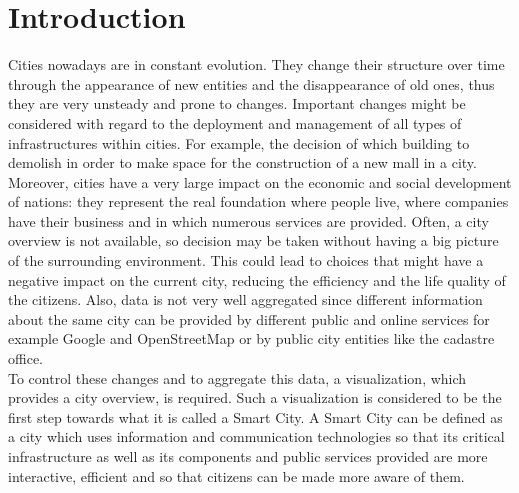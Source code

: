 \section{Introduction} \label{introduction}
Cities nowadays are in constant evolution. They change their structure over time through the appearance of new entities and the disappearance of old ones, thus they are very unsteady and prone to changes. Important changes might be considered with regard to the deployment and management of all types of infrastructures within cities. For example, the decision of which building to demolish in order to make space for the construction of a new mall in a city.\\

Moreover, cities have a very large impact on the economic and social development of nations: they represent the real foundation where people live, where companies have their business and in which numerous services are provided. Often, a city overview is not available, so decision may be taken without having a big picture of the surrounding environment. This could lead to choices that might have a negative impact on the current city, reducing the efficiency and the life quality of the citizens. Also, data is not very well aggregated since different information about the same city can be provided by different public and online services for example Google and OpenStreetMap or by public city entities like the cadastre office.\\

To control these changes and to aggregate this data, a visualization, which provides a city overview, is required. Such a visualization is considered to be the first step towards what it is called a Smart City. A Smart City can be defined as a city which uses information and communication technologies so that its critical infrastructure as well as its components and public services provided are more interactive, efficient and so that citizens can be made more aware of them.\\

